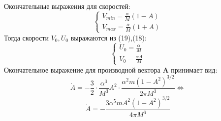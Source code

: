 \documentclass[12pt]{article}
\begin{document}
	Окончательные выражения для скоростей:
	\begin{equation}\begin{cases}
	V_{min} = \frac{\alpha}{M}(1-A) \\
	V_{max} = \frac{\alpha}{M}(1+A)
	\end{cases}
	\end{equation}
	Тогда скорости $V_0,U_0$ выражаются из (19),(18):
	\begin{equation}
	\begin{cases}
	U_0 = \frac{\alpha}{M} \\ 
	V_0 = \frac{\alpha A}{M}
	\end{cases}
	\end{equation}
	Окончательное выражение для производной вектора $\mathbf{A}$ принимает вид:
	\[
		\dot{A} = -\frac{3}{2}\cdot\frac{\alpha^3}{M^3}A^2 \cdot \frac{\alpha^2 m (1-A^2)^{3/2}}{2\pi M^3} \Leftrightarrow
	\]
	\begin{equation}
		\boxed{\dot{A} = -\frac{3\alpha^5 m A^2 (1-A^2)^{3/2}}{4\pi M^6}}
	\end{equation}
\end{document}
